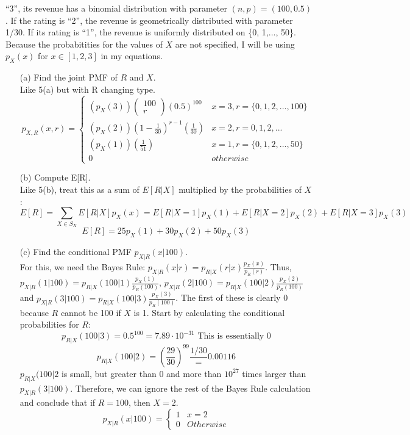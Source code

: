 \documentclass{report}
\begin{document}
\begin{enumerate}
“3”, its revenue has a binomial distribution with parameter $(n, p) = (100, 0.5)$. If the rating is “2”, the
revenue is geometrically distributed with parameter 1/30. If its rating is “1”, the revenue is uniformly
distributed on \{0, 1,..., 50\}.\\
Because the probabitities for the values of $X$ are not specified, I will be using $p_X(x)$ for $x \in [1,2,3]$ in my equations.
\begin{itemize}
\item[(a)] Find the joint PMF of $R$ and $X$.\\
Like 5(a) but with R changing type.
$$ p_{X,R}(x,r) = \left. \begin{cases}
(p_X(3))\left(\!
    \begin{array}{c}
      100 \\
      r
    \end{array}
  \!\right)(0.5)^{100} & x= 3, r = \{0,1,2,...,100\} \\
(p_X(2))(1-\frac{1}{30})^{r-1}(\frac{1}{30}) & x = 2, r = 0,1,2,... \\
(p_X(1))(\frac{1}{51}) & x = 1, r = \{0,1,2,...,50\} \\
0 & otherwise
\end{cases} \right.$$
\item[(b)] Compute E[R].\\
Like 5(b), treat this as a sum of $E[R|X]$ multiplied by the probabilities of $X$:
$$E[R] = \sum_{X \in S_X} E[R|X]p_X(x) = E[R|X=1]p_X(1)+ E[R|X=2]p_X(2)+ E[R|X=3]p_X(3)$$
$$E[R] = 25p_X(1) + 30p_X(2) + 50p_X(3)  $$
\item[(c)] Find the conditional PMF $p_{X|R}(x|100)$. \\
For this, we need the Bayes Rule: $p_{X|R}(x|r) = p_{R|X}(r|x)\frac{p_X(x)}{p_R(r)}$. Thus,$p_{X|R}(1|100) = p_{R|X}(100|1)\frac{p_X(1)}{p_R(100)}$, $p_{X|R}(2|100) = p_{R|X}(100|2)\frac{p_X(2)}{p_R(100)}$ and $p_{X|R}(3|100) = p_{R|X}(100|3)\frac{p_X(3)}{p_R(100)}$.
The first of these is clearly 0 because $R$ cannot be 100 if $X$ is 1. Start by calculating the conditional probabilities for $R$:
$$p_{R|X}(100|3) = 0.5^{100} = 7.89 \cdot 10^{-31} \text{ This is essentially 0}$$
$$p_{R|X}(100|2) = (\frac{29}{30})^{99}\frac{1/30} = 0.00116$$
 $p_{R|X}(100|2$ is small, but greater than 0 and more than $10^{27}$ times larger than $p_{X|R}(3|100)$. Therefore, we can ignore the rest of the Bayes Rule calculation and conclude that if $R=100$, then $X=2$.
 $$p_{X|R}(x|100) = \left. \begin{cases}
 1 & x=2 \\
 0 & Otherwise
 \end{cases} \right.$$


\end{itemize}
\end{enumerate}

 
\end{document}

